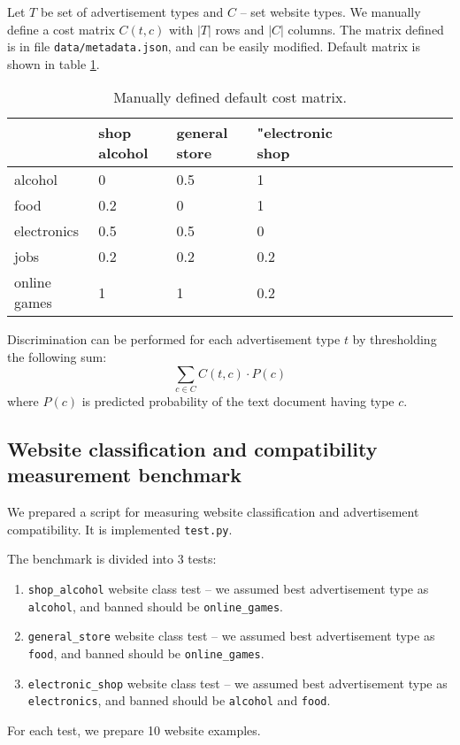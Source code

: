 \documentclass[a4paper]{article}
\begin{document}
Let $T$ be set of advertisement types and $C$ -- set website types.
We manually define a cost matrix $C(t, c)$ 
with $|T|$ rows and $|C|$ columns.
The matrix defined is in file \texttt{data/metadata.json},
and can be easily modified. Default matrix is shown in table \ref{table:costmx}.

\begin{table}[!hbt]
    \caption{Manually defined default cost matrix.
    \label{table:costmx}
    }
\footnotesize
\begin{center}
    \begin{tabular}{|l|l|l|l|l|l|l|l|l|l|l|}
    \hline
        & shop alcohol & general store  & "electronic shop \\
    \hline
          alcohol & 0& 0.5&   1 \\
    \hline
        food & 0.2&   0&   1 \\
    \hline
        electronics & 0.5& 0.5&   0 \\
    \hline
        jobs & 0.2& 0.2& 0.2 \\
    \hline
          online games & 1&   1& 0.2 \\
    \hline
    \end{tabular}
\end{center}
\end{table}

Discrimination can be performed for each advertisement type $t$
by thresholding the following sum:
\begin{equation}
    \sum_{c\in{C}} {C(t, c) \cdot P(c)}
\end{equation}
where $P(c)$ is predicted probability of the text document having type $c$.



\subsection{Website classification and compatibility measurement benchmark}

We prepared a script for measuring website classification and
advertisement compatibility.
It is implemented \texttt{test.py}.

The benchmark is divided into 3 tests:
\begin{enumerate}
    \item \texttt{shop\_alcohol} website class test --
        we assumed best advertisement type as \texttt{alcohol},
        and banned should be \texttt{online\_games}.
    \item \texttt{general\_store} website class test --
        we assumed best advertisement type as \texttt{food},
        and banned should be \texttt{online\_games}.
    \item \texttt{electronic\_shop} website class test --
        we assumed best advertisement type as \texttt{electronics},
        and banned should be \texttt{alcohol} and \texttt{food}.
\end{enumerate}
For each test, we prepare 10 website examples.
\end{document}
